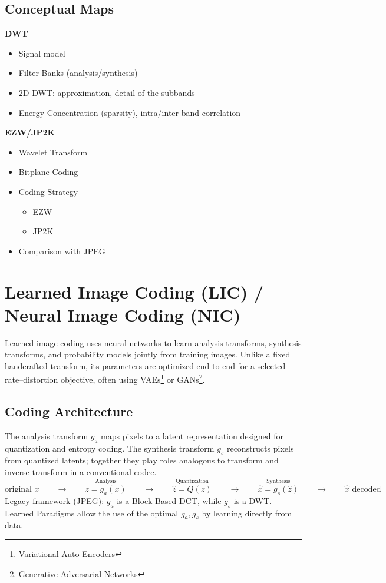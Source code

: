 \subsection{Conceptual Maps}
\begin{minipage}{0.6\textwidth}
    \textbf{DWT}
    \begin{itemize}
        \item Signal model
        \item Filter Banks (analysis/synthesis)
        \item 2D-DWT: approximation, detail of the subbands
        \item Energy Concentration (sparsity), intra/inter band correlation
    \end{itemize}    
\end{minipage}
\begin{minipage}{0.35\textwidth}
    \textbf{EZW/JP2K}
    \begin{itemize}
        \item Wavelet Transform
        \item Bitplane Coding
        \item Coding Strategy
        \begin{itemize}
            \item EZW
            \item JP2K
        \end{itemize}
        \item Comparison with JPEG
    \end{itemize}    
\end{minipage}
\section{Learned Image Coding (LIC) / Neural Image Coding (NIC)}
Learned image coding uses neural networks to learn analysis transforms, synthesis transforms, and probability models jointly from training images. Unlike a fixed handcrafted transform, its parameters are optimized end to end for a selected rate--distortion objective, often using VAEs\footnote{Variational Auto-Encoders} or GANs\footnote{Generative Adversarial Networks}.
\subsection{Coding Architecture}
The analysis transform $g_a$ maps pixels to a latent representation designed for quantization and entropy coding. The synthesis transform $g_s$ reconstructs pixels from quantized latents; together they play roles analogous to transform and inverse transform in a conventional codec.
$$\text{original }x \qquad \longrightarrow \qquad \boxed{\stackrel{\text{Analysis}}{z = g_a(x)}} \qquad \longrightarrow \qquad \boxed{\stackrel{\text{Quantization}}{\hat{z} = Q(z)}} \qquad \longrightarrow \qquad \boxed{\stackrel{\text{Synthesis}}{\hat{x} = g_s(\hat{z})}} \qquad \longrightarrow \qquad \hat{x} \text{ decoded}$$
Legacy framework (JPEG): $g_a$ is a Block Based DCT, while $g_s$ is a DWT.\\
Learned Paradigms allow the use of the optimal $g_a, g_s$ by learning directly from data.
